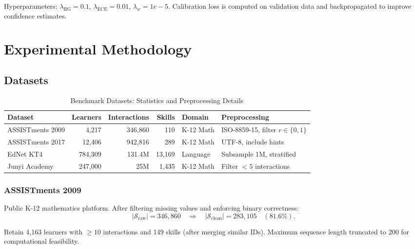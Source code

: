 \documentclass[preprint,12pt]{elsarticle}
\begin{document}
Hyperparameters: $\lambda_{\text{HG}} = 0.1$, $\lambda_{\text{ECE}} = 0.01$, $\lambda_w = 1e-5$. Calibration loss is computed on validation data and backpropagated to improve confidence estimates.

\section{Experimental Methodology}\label{sec:methodology}

\subsection{Datasets}\label{subsec:datasets}

\begin{table}[H]\centering
\caption{Benchmark Datasets: Statistics and Preprocessing Details}\label{tab:datasets}
\small
\begin{tabularx}{\linewidth}{@{\extracolsep{\fill}}lrrrll@{}}\toprule
\textbf{Dataset} & \textbf{Learners} & \textbf{Interactions} & \textbf{Skills} & \textbf{Domain} & \textbf{Preprocessing}\\\midrule
ASSISTments 2009 & 4,217 & 346,860 & 110 & K-12 Math & ISO-8859-15, filter $r \in \{0,1\}$\\
ASSISTments 2017 & 12,406 & 942,816 & 289 & K-12 Math & UTF-8, include hints\\
EdNet KT4 & 784,309 & 131.4M & 13,169 & Language & Subsample 1M, stratified\\
Junyi Academy & 247,000 & 25M & 1,435 & K-12 Math & Filter $< 5$ interactions\\
\bottomrule\end{tabularx}
\end{table}

\subsubsection{ASSISTments 2009}

Public K-12 mathematics platform. After filtering missing values and enforcing binary correctness:
\begin{equation}
|\mathcal{S}_{\text{raw}}| = 346,860 \quad \Rightarrow \quad |\mathcal{S}_{\text{clean}}| = 283,105 \quad (81.6\%).
\end{equation}

Retain 4,163 learners with $\geq 10$ interactions and 149 skills (after merging similar IDs). Maximum sequence length truncated to 200 for computational feasibility.
\end{document}
